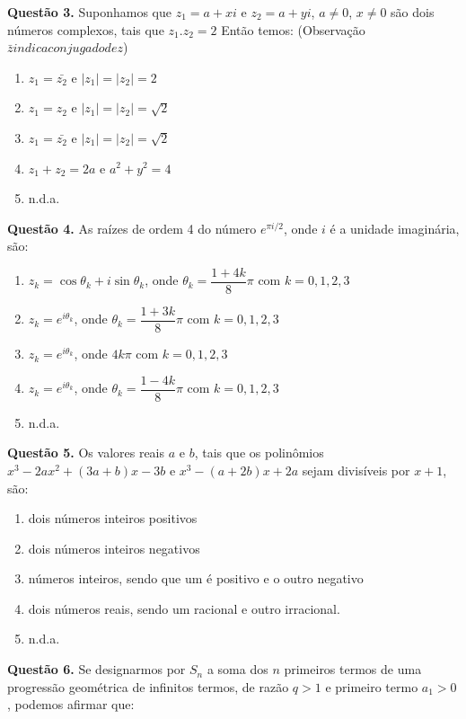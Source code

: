 \documentclass[11pt]{article}
\begin{document}
\textbf{Questão 3.} Suponhamos que $z_1 = a + xi$ e $z_2 = a + yi$, $a \neq 0$, $x \neq 0$ são dois números complexos, tais que $z_1.z_2 = 2$ Então temos: (Observação $\bar{z} indica conjugado de z$) 

\begin{enumerate}[\bf A (\quad)]
	\item $z_1 = \bar{z_2}$ e $|z_1| = |z_2| = 2$
    \item $z_1 = z_2$ e $|z_1| = |z_2| = \sqrt{2}$
    \item $z_1 = \bar{z_2}$ e $|z_1| = |z_2| = \sqrt{2}$
    \item $z_1 + z_2 = 2a$ e $a^2 + y^2 = 4$
    \item n.d.a.
\end{enumerate}

\textbf{Questão 4.} As raízes de ordem 4 do número $e^{\pi i/2}$, onde $i$ é a unidade imaginária, são:

\begin{enumerate}[\bf A (\quad)]
	\item $z_k = \cos \theta_k + i \sin \theta_k$, onde $\theta_k = \dfrac{1+4k}{8}\pi$ com $k = 0,1,2,3$
    \item $z_k = e^{i \theta_k}$, onde $\theta_k = \dfrac{1+3k}{8}\pi$ com $k = 0,1,2,3$
    \item $z_k = e^{i \theta_k}$, onde $4k\pi$ com $k = 0,1,2,3$
    \item $z_k = e^{i \theta_k}$, onde $\theta_k = \dfrac{1-4k}{8}\pi$ com $k = 0,1,2,3$
    \item n.d.a.
\end{enumerate}

\textbf{Questão 5.} Os valores reais $a$ e $b$, tais que os polinômios $x^3 - 2ax^2 + (3a + b)x - 3b$ e $x^3 - (a+2b)x + 2a$ sejam divisíveis por $x+1$, são:
 
\begin{enumerate}[\bf A (\quad)]
    \item dois números inteiros positivos
    \item dois números inteiros negativos
    \item números inteiros, sendo que um é positivo e o outro negativo
    \item dois números reais, sendo um racional e outro irracional.
    \item n.d.a.
\end{enumerate}

\textbf{Questão 6.} Se designarmos por $S_n$ a soma dos $n$ primeiros termos de uma progressão geométrica de infinitos termos, de razão $q > 1$ e primeiro termo $a_1 > 0$, podemos afirmar que: 
\end{document}
